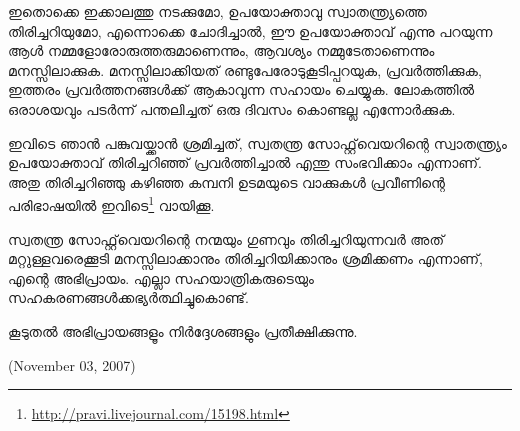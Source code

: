 ഇതൊക്കെ ഇക്കാലത്തു നടക്കുമോ, ഉപയോക്താവു സ്വാതന്ത്ര്യത്തെ തിരിച്ചറിയുമോ, എന്നൊക്കെ ചോദിച്ചാല്‍, ഈ ഉപയോക്താവ് എന്നു പറയുന്ന ആള്‍ നമ്മളോരോരുത്തരുമാണെന്നും, ആവശ്യം നമ്മുടേതാണെന്നും മനസ്സിലാക്കുക. മനസ്സിലാക്കിയത് രണ്ടുപേരോടുകൂടിപ്പറയുക, പ്രവര്‍ത്തിക്കുക, ഇത്തരം പ്രവര്‍ത്തനങ്ങള്‍ക്ക് ആകാവുന്ന സഹായം ചെയ്യുക. ലോകത്തില്‍ ഒരാശയവും പടര്‍ന്ന് പന്തലിച്ചത് ഒരു ദിവസം കൊണ്ടല്ല എന്നോര്‍ക്കുക.

ഇവിടെ ഞാന്‍ പങ്കുവയ്ക്കാന്‍ ശ്രമിച്ചത്, സ്വതന്ത്ര സോഫ്റ്റ്‌വെയറിന്റെ സ്വാതന്ത്ര്യം ഉപയോക്താവ് തിരിച്ചറിഞ്ഞ് പ്രവര്‍ത്തിച്ചാല്‍ എന്തു സംഭവിക്കാം എന്നാണ്. അതു തിരിച്ചറിഞ്ഞു കഴിഞ്ഞ കമ്പനി ഉടമയുടെ വാക്കുകള്‍ പ്രവീണിന്റെ പരിഭാഷയില്‍ ഇവിടെ\footnote{\url{http://pravi.livejournal.com/15198.html}} വായിക്കൂ.

സ്വതന്ത്ര സോഫ്റ്റ്‌വെയറിന്റെ നന്മയും ഗുണവും തിരിച്ചറിയുന്നവര്‍ അത് മറ്റുള്ളവരെക്കൂടി മനസ്സിലാക്കാനും തിരിച്ചറിയിക്കാനും ശ്രമിക്കണം എന്നാണ്, എന്റെ അഭിപ്രായം. എല്ലാ സഹയാത്രികരുടെയും സഹകരണങ്ങള്‍ക്കഭ്യര്‍ത്ഥിച്ചുകൊണ്ട്.

കൂടുതല്‍ അഭിപ്രായങ്ങളൂം നിര്‍‌ദ്ദേശങ്ങളും പ്രതീക്ഷിക്കുന്നു.

(November 03, 2007)
\newpage
